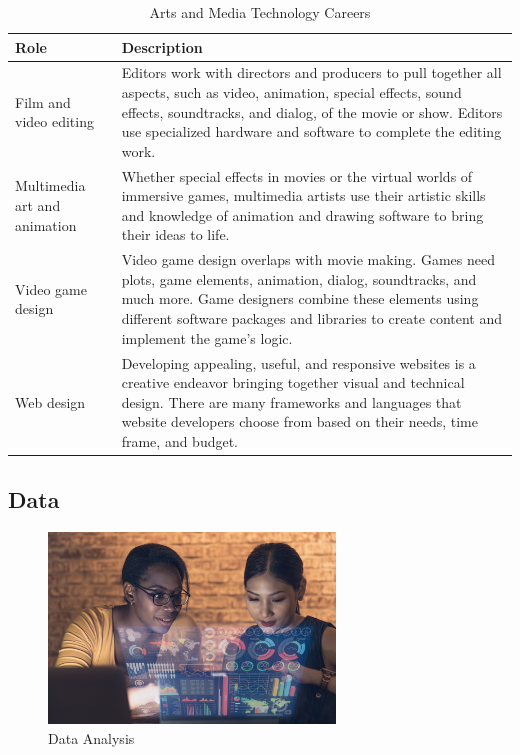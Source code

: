 \begin{table}[H]
	\begin{center}
		\caption{Arts and Media Technology Careers}
		\vskip 4pt
		\begin{tabular}{p{1in}|p{3.4in}} 
			\textbf{Role} & \textbf{Description}\\
			\hline
			Film and video editing & Editors work with directors and producers to pull together all aspects, such as video, animation, special effects, sound effects, soundtracks, and dialog, of the movie or show. Editors use specialized hardware and software to complete the editing work.\\
			\hline
			Multimedia art and animation & Whether special effects in movies or the virtual worlds of immersive games, multimedia artists use their artistic skills and knowledge of animation and drawing software to bring their ideas to life.\\
			\hline
			Video game design & Video game design overlaps with movie making. Games need plots, game elements, animation, dialog, soundtracks, and much more. Game designers combine these elements using different software packages and libraries to create content and implement the game's logic.\\
			\hline
			Web design & Developing appealing, useful, and responsive websites is a creative endeavor bringing together visual and technical design. There are many frameworks and languages that website developers choose from based on their needs, time frame, and budget.\\
			\hline
		\end{tabular}
	\end{center}
\end{table}

\subsection{Data}


\begin{figure}[H]
	\begin{center}
		\caption{Data Analysis}
		\vskip 4pt
		\includegraphics[height=2in]{images/careers/iStock-1364769258.small.jpg}
	\end{center}
\end{figure}

